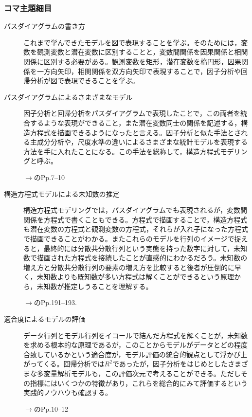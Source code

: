 \subsubsection{コマ主題細目}
\begin{description}
	\item[パスダイアグラムの書き方] これまで学んできたモデルを図で表現することを学ぶ。そのためには，変数を観測変数と潜在変数に区別することと，変数間関係を因果関係と相関関係に区別する必要がある。観測変数を矩形，潜在変数を楕円形，因果関係を一方向矢印，相関関係を双方向矢印で表現することで，因子分析や回帰分析が図で表現できることを学ぶ。

	\item[パスダイアグラムによるさまざまなモデル] 因子分析と回帰分析をパスダイアグラムで表現したことで，この両者を統合するような表現ができること，また潜在変数同士の関係を記述する，構造方程式を描画できるようになったと言える。因子分析と似た手法とされる主成分分析や，尺度水準の違いによるさまざまな統計モデルを表現する方法を手に入れたことになる。この手法を総称して，構造方程式モデリングと呼ぶ。

	      \begin{flushright}
		      $\to$\textcite{Kosugi2014Mplus}のPp.7--10
	      \end{flushright}


	\item[構造方程式モデルによる未知数の推定] 構造方程式モデリングでは，パスダイアグラムでも表現されるが，変数間関係を方程式で書くこともできる。方程式で描画することで，構造方程式も潜在変数の方程式と観測変数の方程式，それらが入れ子になった方程式で描画できることがわかる。またこれらのモデルを行列のイメージで捉えると，最終的には分散共分散行列という実態を持った数字に対して，未知数で描画された方程式を接続したことが直感的にわかるだろう。未知数の増え方と分散共分散行列の要素の増え方を比較すると後者が圧倒的に早く，未知数よりも既知数が多い方程式は解くことができるという原理から，未知数が推定しうることを理解する。

	      \begin{flushright}
		      $\to$\textcite{kosugi2018}のPp.191--193.
	      \end{flushright}

	\item[適合度によるモデルの評価]  データ行列とモデル行列をイコールで結んだ方程式を解くことが，未知数を求める根本的な原理であるが，このことからモデルがデータとどの程度合致しているかという適合度が，モデル評価の統合的観点として浮かび上がってくる。回帰分析では$R^2$であったが，因子分析をはじめとしたさまざまな多変量解析モデルも，この評価次元で考えることができる。ただしその指標にはいくつかの特徴があり，これらを総合的にみて評価するという実践的ノウハウも確認する。


	      \begin{flushright}
		      $\to$\textcite{Kosugi2014Mplus}のPp.10--12
	      \end{flushright}


\end{description}
